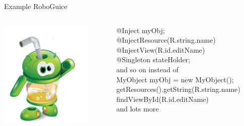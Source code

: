 \documentclass[aspectratio=169]{beamer}
\begin{document}
    \begin{frame}{Example RoboGuice}
      \begin{columns}[t]
        \begin{column}{0.3\textwidth}
          \begin{center}
            \includegraphics[height=2.0in]{roboguice.png}
          \end{center}
        \end{column}

       \begin{column}{0.7\textwidth}
        @Inject myObj; \\
        @InjectResource(R.string.name) \\
        @InjectView(R.id.editName) \\
        @Singleton stateHolder; \\
        and so on instead of \\
        MyObject myObj = new MyObject(); \\
        getResources().getString(R.string.name) \\ 
        findViewById(R.id.editName) \\
        and lots more \\
        \end{column}
      \end{columns}
    \end{frame}
  
\end{document}
